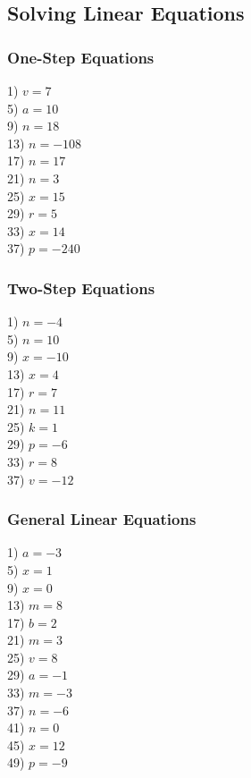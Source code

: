 \documentclass[11pt]{book}
\begin{document}
\subsection*{Solving Linear Equations}

\subsubsection{One-Step Equations}

\begin{multicols}{2}
1) $v=7$\\
5) $a=10$\\
9) $n=18$\\
13) $n=-108$\\
17) $n=17$\\
21) $n=3$\\
25) $x=15$\\
29) $r=5$\\
33) $x=14$\\
37) $p=-240$
\end{multicols}

\subsubsection{Two-Step Equations}

\begin{multicols}{2}
1) $n=-4$\\
5) $n=10$\\
9) $x=-10$\\
13) $x=4$\\
17) $r=7$\\
21) $n=11$\\
25) $k=1$\\
29) $p=-6$\\
33) $r=8$\\
37) $v=-12$
\end{multicols}

\subsubsection{General Linear Equations}

\begin{multicols}{2}
1) $a=-3$\\
5) $x=1$\\
9) $x=0$\\
13) $m=8$\\
17) $b=2$\\
21) $m=3$\\
25) $v=8$\\
29) $a=-1$\\
33) $m=-3$\\
37) $n=-6$\\
41) $n=0$\\
45) $x=12$\\
49) $p=-9$
\end{multicols}
\end{document}
